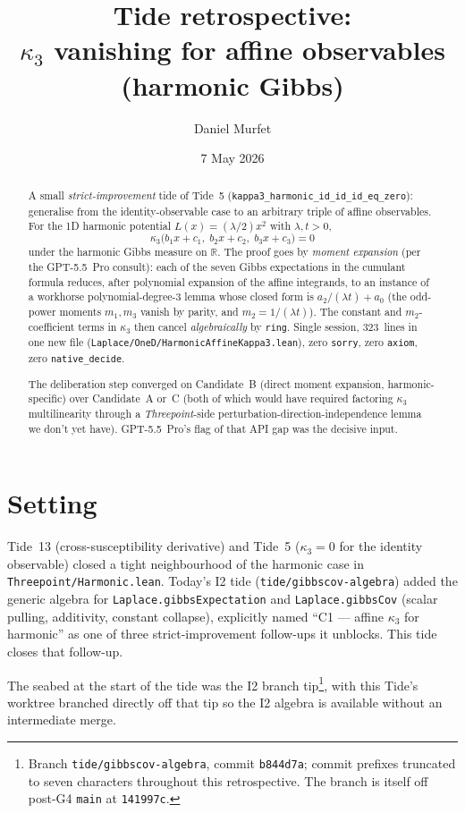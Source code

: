 \documentclass[11pt]{article}
\title{Tide retrospective:\\$\kappa_3$ vanishing for affine observables (harmonic Gibbs)}
\author{Daniel Murfet}
\date{7 May 2026}
\begin{document}
\maketitle

\begin{abstract}
A small \emph{strict-improvement} tide of Tide~5
(\texttt{kappa3\_harmonic\_id\_id\_id\_eq\_zero}): generalise from the
identity-observable case to an arbitrary triple of affine
observables. For the 1D harmonic potential
$L(x) = (\lambda/2) x^2$ with $\lambda, t > 0$,
\[
  \kappa_3\bigl(b_1 x + c_1,\; b_2 x + c_2,\; b_3 x + c_3\bigr) = 0
\]
under the harmonic Gibbs measure on $\mathbb{R}$. The proof goes by
\emph{moment expansion} (per the GPT-5.5~Pro consult): each of the
seven Gibbs expectations in the cumulant formula reduces, after
polynomial expansion of the affine integrands, to an instance of a
workhorse polynomial-degree-3 lemma whose closed form is
$a_2/(\lambda t) + a_0$ (the odd-power moments
$m_1, m_3$ vanish by parity, and $m_2 = 1/(\lambda t)$). The
constant and $m_2$-coefficient terms in $\kappa_3$ then cancel
\emph{algebraically} by \texttt{ring}. Single session, 323~lines in
one new file (\texttt{Laplace/OneD/HarmonicAffineKappa3.lean}), zero
\texttt{sorry}, zero \texttt{axiom}, zero \texttt{native\_decide}.

The deliberation step converged on Candidate~B (direct moment
expansion, harmonic-specific) over Candidate~A or~C (both of which
would have required factoring $\kappa_3$ multilinearity through a
\emph{Threepoint}-side perturbation-direction-independence lemma we
don't yet have). GPT-5.5~Pro's flag of that API gap was the decisive
input.
\end{abstract}

\section{Setting}

Tide~13 (cross-susceptibility derivative) and Tide~5
($\kappa_3 = 0$ for the identity observable) closed a tight
neighbourhood of the harmonic case in
\texttt{Threepoint/Harmonic.lean}. Today's I2 tide
(\texttt{tide/gibbscov-algebra}) added the generic algebra for
\texttt{Laplace.gibbsExpectation} and \texttt{Laplace.gibbsCov}
(scalar pulling, additivity, constant collapse), explicitly named
``C1 — affine $\kappa_3$ for harmonic'' as one of three
strict-improvement follow-ups it unblocks. This tide closes that
follow-up.

The seabed at the start of the tide was the I2 branch
tip\footnote{Branch \texttt{tide/gibbscov-algebra}, commit
\texttt{b844d7a}; commit prefixes truncated to seven characters
throughout this retrospective. The branch is itself off post-G4
\texttt{main} at \texttt{141997c}.}, with this Tide's worktree
branched directly off that tip so the I2 algebra is available
without an intermediate merge.
\end{document}
